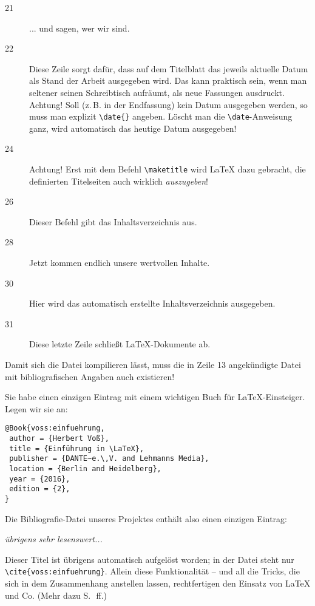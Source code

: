 \begin{description}
 \item[21] ... und sagen, wer wir sind.
 \item[22] Diese Zeile sorgt dafür, dass auf dem Titelblatt das jeweils aktuelle Datum als 
 Stand der Arbeit ausgegeben wird. Das kann praktisch sein, wenn man seltener seinen Schreibtisch
 aufräumt, als neue Fassungen ausdruckt.\\
 Achtung! Soll (z.\,B. in der Endfassung) kein Datum ausgegeben werden, so muss man explizit
 \lstinline/\date{}/ angeben. Löscht man die \lstinline/\date/-Anweisung ganz, wird 
 automatisch das heutige Datum ausgegeben!
 \item[24] Achtung! Erst mit dem Befehl \lstinline/\maketitle/ wird \LaTeX{} dazu gebracht,
 die definierten Titelseiten auch wirklich \emph{auszugeben}!
 \item[26] Dieser Befehl gibt das Inhaltsverzeichnis aus.
 \item[28] Jetzt kommen endlich unsere wertvollen Inhalte.
 \item[30] Hier wird das automatisch erstellte Inhaltsverzeichnis ausgegeben.
 \item[31] Diese letzte Zeile schließt \LaTeX -Dokumente ab.
 \end{description}
 
 

Damit sich die Datei kompilieren lässt, muss die in Zeile 13 angekündigte Datei mit 
bibliografischen Angaben auch existieren!

Sie habe einen einzigen Eintrag mit einem wichtigen Buch für \LaTeX -Einsteiger.
Legen wir sie an:

\begin{lstlisting}
@Book{voss:einfuehrung,
 author = {Herbert Voß}, 
 title = {Einführung in \LaTeX},
 publisher = {DANTE~e.\,V. and Lehmanns Media},
 location = {Berlin and Heidelberg},
 year = {2016},
 edition = {2},
}
\end{lstlisting}

Die Bibliografie-Datei unseres Projektes enthält also einen einzigen Eintrag:
\bigskip

\parbox{40mm}{
   \emph{übrigens sehr lesenswert...}
}
\bigskip

Dieser Titel ist übrigens automatisch aufgelöst worden; 
in der Datei steht nur \lstinline/\cite{voss:einfuehrung}/.
Allein diese Funktionalität -- und all die Tricks, die sich in dem Zusammenhang anstellen
lassen, rechtfertigen den Einsatz von \LaTeX{} und Co. (Mehr dazu S.~\pageref{biblatex}\,ff.)

\endinput


